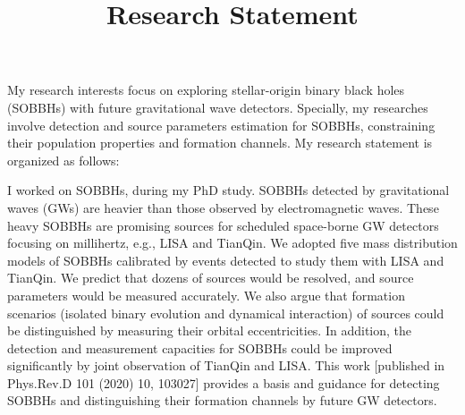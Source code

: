 \documentclass[12pt,a4paper,sans]{article}%
\title{\vspace{-2.5cm}\Huge Research Statement \vspace{-2.2em}}
\date{}
\begin{document}
\maketitle

My research interests focus on exploring stellar-origin binary black holes (SOBBHs) with future gravitational wave detectors. Specially, my researches involve detection
and source parameters estimation for SOBBHs, constraining their population properties and formation channels. My research statement is organized as
follows:  

I worked on SOBBHs, during my PhD study. SOBBHs detected by
gravitational waves (GWs) are heavier than those observed by electromagnetic waves. These heavy SOBBHs are promising sources for scheduled
space-borne GW detectors focusing on millihertz, e.g., LISA and TianQin. We adopted five mass
distribution models of SOBBHs calibrated by events detected to study them with LISA and TianQin. We predict that dozens of sources would be resolved, and source parameters
would be measured accurately. We also argue that formation scenarios (isolated binary evolution and dynamical interaction) of sources
could be distinguished by measuring their orbital eccentricities. In addition, the detection and measurement capacities
for SOBBHs could be improved significantly by joint
observation of TianQin and LISA. This work [published in Phys.Rev.D 101 (2020) 10, 103027] provides a basis and guidance for detecting SOBBHs and distinguishing their formation channels by future GW
detectors. 
\end{document}
